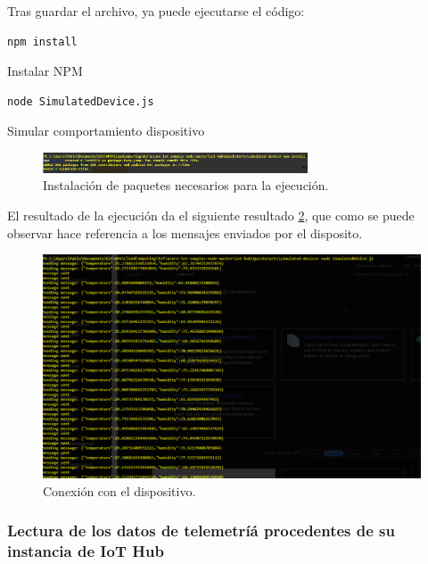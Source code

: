 \documentclass[english,runningheads,a4paper]{llncs}[2018/03/10]
\begin{document}
Tras guardar el archivo, ya puede ejecutarse el código:
\begin{listing}[htp]
\centering
    \begin{verbatim}
npm install
    \end{verbatim}
\caption{Instalar NPM}
\label{ejecdev1}
\end{listing}

\begin{listing}[htp]
\centering
    \begin{verbatim}
node SimulatedDevice.js
    \end{verbatim}
\caption{Simular comportamiento dispositivo}
\label{ejecdev2}
\end{listing}

\begin{figure}[h!]
 \centering
 \includegraphics[width=0.7\textwidth]{./IoT/MicrosoftAzure/4-4_send_simulated_telemetry.png}
 \caption{Instalación de paquetes necesarios para la ejecución.}
 \label{npmdev}
\end{figure}

El resultado de la ejecución da el siguiente resultado
\hyperref[nodedev]{\ref{nodedev}}, que como se puede observar hace referencia a 
los mensajes enviados por el disposito.

\begin{figure}[h!]
 \centering
 \includegraphics[width=\textwidth]{./IoT/MicrosoftAzure/4-5_send_simulated_telemetry.png}
 \caption{Conexión con el dispositivo.}
 \label{nodedev}
\end{figure}

\subsubsection{Lectura de los datos de telemetríá procedentes de su instancia de
IoT Hub}
\end{document}
